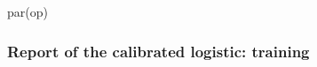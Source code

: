 \documentclass[
]{article}
\newenvironment{Shaded}{\begin{snugshade}}{\end{snugshade}}
\newcommand{\AttributeTok}[1]{\textcolor[rgb]{0.77,0.63,0.00}{#1}}
\newcommand{\FunctionTok}[1]{\textcolor[rgb]{0.00,0.00,0.00}{#1}}
\newcommand{\NormalTok}[1]{#1}
\newcommand{\SpecialCharTok}[1]{\textcolor[rgb]{0.00,0.00,0.00}{#1}}
\newcommand{\StringTok}[1]{\textcolor[rgb]{0.31,0.60,0.02}{#1}}
\begin{document}
\begin{Shaded}
\begin{Highlighting}[]
\FunctionTok{par}\NormalTok{(op)}
\end{Highlighting}
\end{Shaded}

\hypertarget{report-of-the-calibrated-logistic-training}{%
\subsubsection{Report of the calibrated logistic:
training}\label{report-of-the-calibrated-logistic-training}}

\begin{Shaded}
\end{Shaded}
\end{document}
